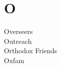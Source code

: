 \section*{O}

\articlesize

\begin{description}
 \item[Overseers]

 \item[Outreach]

 \item[Orthodox Friends]

 \item[Oxfam]
 \end{description}

\normalsize
